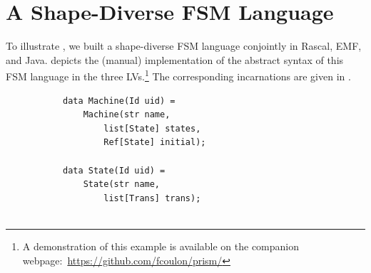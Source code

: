 \section{A Shape-Diverse FSM Language}
\label{sec:eval}

To illustrate \prism, we built a shape-diverse FSM language conjointly in Rascal, EMF, and Java.
 depicts the (manual) implementation of the abstract syntax of this FSM language in the three LVs.\footnote{A demonstration of this example is available on the companion webpage:~\url{https://github.com/fcoulon/prism/}}
The corresponding incarnations are given in .

\begin{figure}[bt]
	\centering
	\begin{subfigure}[b]{.3\columnwidth}
		\begin{lstlisting}[label=lst:fsm-adt, language=Rascal, numbers=none, xleftmargin=0pt, tabsize=1]
data Machine(Id uid) =
	Machine(str name,
		list[State] states,
		Ref[State] initial);

data State(Id uid) =
	State(str name,
		list[Trans] trans);


\end{lstlisting}
\end{subfigure}
\end{figure}
